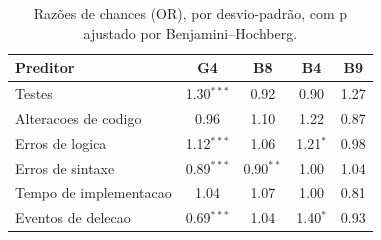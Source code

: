\begin{table}[H]
\centering\footnotesize
\caption{Razões de chances (OR), por desvio-padrão, com p ajustado por Benjamini--Hochberg.}
\label{tab:glmm_efeitos}
\begin{tabular}{l cccc}
\toprule
Preditor & G4 & B8 & B4 & B9 \\
\midrule
Testes & 1.30$^{***}$ & 0.92 & 0.90 & 1.27 \\
Alteracoes de codigo & 0.96 & 1.10 & 1.22 & 0.87 \\
Erros de logica & 1.12$^{***}$ & 1.06 & 1.21$^{*}$ & 0.98 \\
Erros de sintaxe & 0.89$^{***}$ & 0.90$^{**}$ & 1.00 & 1.04 \\
Tempo de implementacao & 1.04 & 1.07 & 1.00 & 0.81 \\
Eventos de delecao & 0.69$^{***}$ & 1.04 & 1.40$^{*}$ & 0.93 \\
\bottomrule
\end{tabular}
\end{table}
